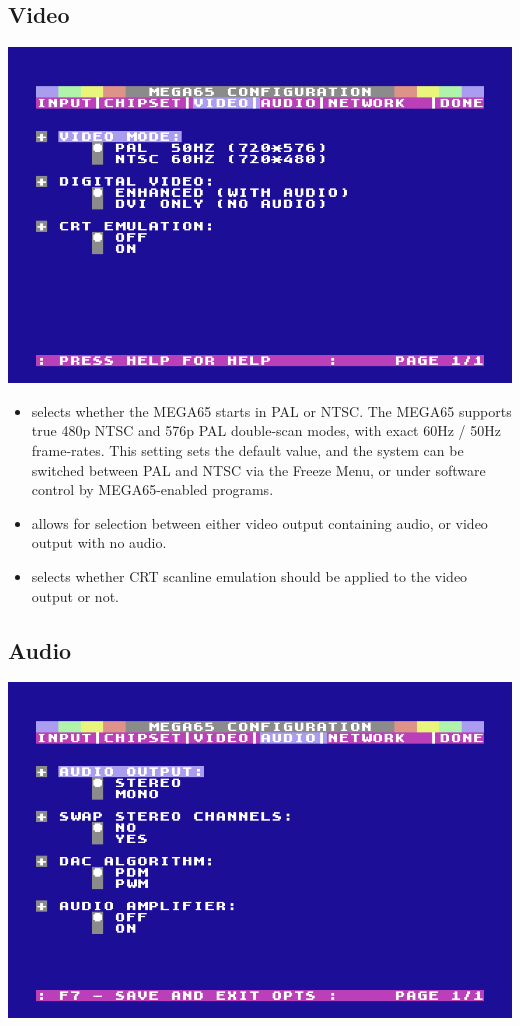 \subsection{Video}
\label{configuring-video}

\begin{center}
\includegraphics[width=0.7\linewidth]{images/ss-m65config-3.png}
\end{center}
\begin{itemize}
  \item {}
    selects whether the MEGA65 starts in PAL or NTSC.
    The MEGA65 supports true 480p NTSC and 576p PAL double-scan modes, with exact
    60Hz / 50Hz frame-rates. This setting sets the default value, and the system
    can be switched between PAL and NTSC via the Freeze Menu, or under software
    control by MEGA65-enabled programs.
  \item {}
    allows for selection between either  video output containing audio,
    or  video output with no audio. \newline
  \item {}
    selects whether CRT scanline emulation should be applied to the video output or not.
\end{itemize}

\subsection{Audio}

\begin{center}
\includegraphics[width=0.7\linewidth]{images/ss-m65config-4.png}
\end{center}

